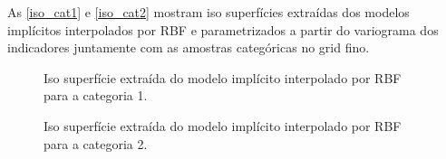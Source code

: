 As \autoref{iso_cat1} e \autoref{iso_cat2} mostram iso superfícies extraídas dos modelos implícitos interpolados por RBF e parametrizados a partir do variograma dos indicadores juntamente com as amostras categóricas no grid fino. 

\begin{figure}[H]
    \caption{Iso superfície extraída do modelo implícito interpolado por RBF para a categoria 1.} \label{iso_cat1}
     \centering
\end{figure}

\begin{figure}[H] 
    \caption{Iso superfície extraída do modelo implícito interpolado por RBF para a categoria 2.} \label{iso_cat2}
     \centering
\end{figure}

